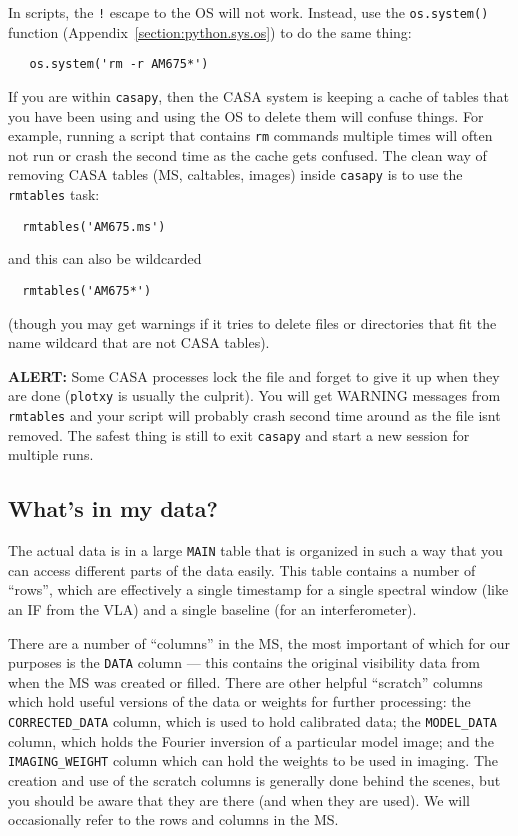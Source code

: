 In scripts, the {\tt !} escape to the OS will not work.  Instead,
use the {\tt os.system()} function
(Appendix~\ref{section:python.sys.os}) to do the same thing:
\small
\begin{verbatim}
   os.system('rm -r AM675*')
\end{verbatim}
\normalsize

If you are within {\tt casapy}, then the CASA system is keeping
a cache of tables that you have been using and using the OS to
delete them will confuse things.  For example, running a script
that contains {\tt rm} commands multiple times will often not
run or crash the second time as the cache gets confused.  The
clean way of removing CASA tables (MS, caltables, images) 
inside {\tt casapy} is to use the {\tt rmtables} task:
\small
\begin{verbatim}
  rmtables('AM675.ms')
\end{verbatim}
\normalsize
and this can also be wildcarded
\small
\begin{verbatim}
  rmtables('AM675*')
\end{verbatim}
\normalsize
(though you may get warnings if it tries to delete files or
directories that fit the name wildcard that are not CASA tables).

{\bf ALERT:} Some CASA processes lock the file and forget to
give it up when they are done ({\tt plotxy} is usually the culprit).
You will get WARNING messages from {\tt rmtables} and your script
will probably crash second time around as the file isnt removed.
The safest thing is still to exit {\tt casapy} and start a new 
session for multiple runs.

\subsection{What's in my data?}
\label{section:intro.common.ms}

The actual data is in a large {\tt MAIN} table that is organized in
such a way that you can access different parts of the data easily.
This table contains a number of ``rows'', which are effectively a
single timestamp for a single spectral window (like an IF from the
VLA) and a single baseline (for an interferometer).  

There are a number of ``columns'' in the MS, the most important of
which for our purposes is the {\tt DATA} column --- this contains the
original visibility data from when the MS was created or filled.
There are other helpful ``scratch'' columns which hold useful versions
of the data or weights for further processing: the {\tt
CORRECTED\_DATA} column, which is used to hold calibrated data; the
{\tt MODEL\_DATA} column, which holds the Fourier inversion of a
particular model image; and the {\tt IMAGING\_WEIGHT} column which
can hold the weights to be used in imaging.  The creation and use
of the scratch columns is generally done behind the scenes, but you
should be aware that they are there (and when they are used).  We
will occasionally refer to the rows and columns in the MS.


